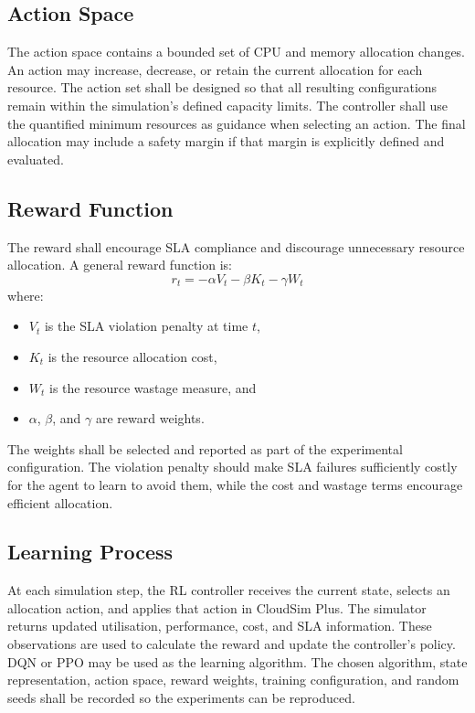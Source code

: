 \documentclass[12pt,a4paper]{report}
\begin{document}
\subsection{Action Space}
The action space contains a bounded set of CPU and memory allocation changes. An action may increase, decrease, or retain the current allocation for each resource. The action set shall be designed so that all resulting configurations remain within the simulation's defined capacity limits.
The controller shall use the quantified minimum resources as guidance when selecting an action. The final allocation may include a safety margin if that margin is explicitly defined and evaluated.
\lipsum[66-70]

\subsection{Reward Function}
The reward shall encourage SLA compliance and discourage unnecessary resource allocation. A general reward function is:
\begin{equation}
r_{t} = -\alpha V_{t} - \beta K_{t} - \gamma W_{t}
\end{equation}
where:
\begin{itemize}
    \item $V_{t}$ is the SLA violation penalty at time $t$,
    \item $K_{t}$ is the resource allocation cost,
    \item $W_{t}$ is the resource wastage measure, and
    \item $\alpha$, $\beta$, and $\gamma$ are reward weights.
\end{itemize}
The weights shall be selected and reported as part of the experimental configuration. The violation penalty should make SLA failures sufficiently costly for the agent to learn to avoid them, while the cost and wastage terms encourage efficient allocation.

\subsection{Learning Process}
At each simulation step, the RL controller receives the current state, selects an allocation action, and applies that action in CloudSim Plus. The simulator returns updated utilisation, performance, cost, and SLA information. These observations are used to calculate the reward and update the controller's policy.
DQN or PPO may be used as the learning algorithm. The chosen algorithm, state representation, action space, reward weights, training configuration, and random seeds shall be recorded so the experiments can be reproduced.
\lipsum[71-75]
\end{document}
